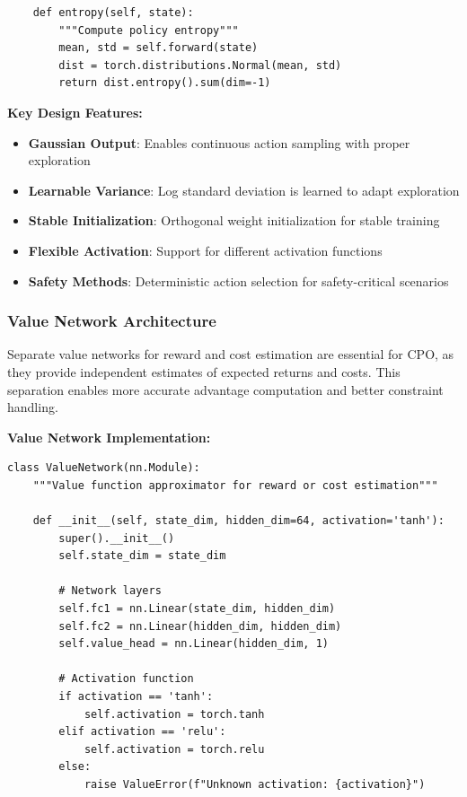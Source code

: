 \documentclass[12pt]{article}
\begin{document}
{{{{\begin{verbatim}
    def entropy(self, state):
        """Compute policy entropy"""
        mean, std = self.forward(state)
        dist = torch.distributions.Normal(mean, std)
        return dist.entropy().sum(dim=-1)
\end{verbatim}

\textbf{Key Design Features:}
\begin{itemize}
\item \textbf{Gaussian Output}: Enables continuous action sampling with proper exploration
\item \textbf{Learnable Variance}: Log standard deviation is learned to adapt exploration
\item \textbf{Stable Initialization}: Orthogonal weight initialization for stable training
\item \textbf{Flexible Activation}: Support for different activation functions
\item \textbf{Safety Methods}: Deterministic action selection for safety-critical scenarios
\end{itemize}

\subsubsection{Value Network Architecture}

Separate value networks for reward and cost estimation are essential for CPO, as they provide independent estimates of expected returns and costs. This separation enables more accurate advantage computation and better constraint handling.

\textbf{Value Network Implementation:}
\begin{verbatim}
class ValueNetwork(nn.Module):
    """Value function approximator for reward or cost estimation"""
    
    def __init__(self, state_dim, hidden_dim=64, activation='tanh'):
        super().__init__()
        self.state_dim = state_dim
        
        # Network layers
        self.fc1 = nn.Linear(state_dim, hidden_dim)
        self.fc2 = nn.Linear(hidden_dim, hidden_dim)
        self.value_head = nn.Linear(hidden_dim, 1)
        
        # Activation function
        if activation == 'tanh':
            self.activation = torch.tanh
        elif activation == 'relu':
            self.activation = torch.relu
        else:
            raise ValueError(f"Unknown activation: {activation}")
        

\end{verbatim}}}}}
\end{document}

